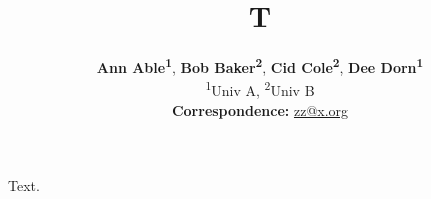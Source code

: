 \documentclass[11pt]{article}
\title{T}
\author{
 \textbf{Ann Able\textsuperscript{1}},
 \textbf{Bob Baker\textsuperscript{2}},
 \textbf{Cid Cole\textsuperscript{2}},
 \textbf{Dee Dorn\textsuperscript{1}}
\\
 \textsuperscript{1}Univ A,
 \textsuperscript{2}Univ B
 \\
 \small{
   \textbf{Correspondence:} \href{zz@x.org}{zz@x.org}
 }
}
\begin{document}
\maketitle
Text.
\end{document}
